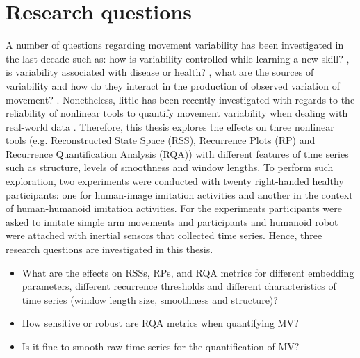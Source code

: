 \section{Research questions}

A number of questions regarding movement variability has been investigated
in the last decade \citep{stergiou2006, stergiou2011} such as: 
how is variability controlled 
while learning a new skill? \citep{wagner2012, seifert2011, bartlett2007}, 
is variability associated with disease or health? 
\citep{stergiou2006, stergiou2011}, what are the sources of variability 
and how do they interact in the production of observed variation 
of movement? \citep{preatoni2007, preatoni2010, preatoni2013}.
Nonetheless, little has been recently investigated with regards to the 
reliability of nonlinear tools to quantify movement 
variability \citep{iwanski1998, yao2017}
when dealing with real-world data \citep{bradley2015, caballero2014}.
Therefore, this thesis explores the effects on three nonlinear tools
(e.g. Reconstructed State Space (RSS), Recurrence Plots (RP) and 
Recurrence Quantification Analysis (RQA)) with different features 
of time series such as structure, levels of smoothness and window lengths.
To perform such exploration, two experiments were conducted with twenty 
right-handed healthy participants: one for human-image imitation 
activities and another in the context of human-humanoid imitation 
activities.
For the experiments participants were asked to imitate simple arm movements
and participants and humanoid robot were attached with inertial sensors 
that collected time series.
Hence, three research questions are investigated in this thesis.

\begin{itemize}

\item What are the effects on RSSs, RPs, and RQA metrics
	for different embedding parameters, different recurrence thresholds 
	and different characteristics of time series 
	(window length size, smoothness and structure)?

\item How sensitive or robust are RQA metrics when quantifying MV?

\item Is it fine to smooth raw time series for the quantification of MV?

\end{itemize}




